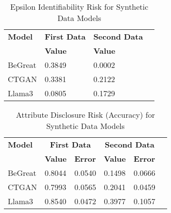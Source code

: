 \begin{table}[H]
    \centering
    \caption{Epsilon Identifiability Risk for Synthetic Data Models}
    \label{tab:epsilon_identifiability_risk_combined}
    \begin{tabularx}{\textwidth}{l*{5}{X}}
        \toprule
        \textbf{Model} & \multicolumn{2}{c}{\textbf{First Data}} & \multicolumn{2}{c}{\textbf{Second Data}} \\
        \cmidrule(lr){2-3} \cmidrule(lr){4-5}
        & \textbf{Value} & & \textbf{Value} \\
        \midrule
        BeGreat & 0.3849 & & 0.0002 \\
        CTGAN & 0.3381 & & 0.2122 \\
        Llama3 & 0.0805 & & 0.1729 \\
        \bottomrule
    \end{tabularx}
\end{table}

\begin{table}[H]
    \centering
    \caption{Attribute Disclosure Risk (Accuracy) for Synthetic Data Models}
    \label{tab:attr_disclosure_risk_combined}
    \begin{tabularx}{\textwidth}{l*{5}{X}}
        \toprule
        \textbf{Model} & \multicolumn{2}{c}{\textbf{First Data}} & \multicolumn{2}{c}{\textbf{Second Data}} \\
        \cmidrule(lr){2-3} \cmidrule(lr){4-5}
        & \textbf{Value} & \textbf{Error} & \textbf{Value} & \textbf{Error} \\
        \midrule
        BeGreat & 0.8044 & 0.0540 & 0.1498 & 0.0666 \\
        CTGAN & 0.7993 & 0.0565 & 0.2041 & 0.0459 \\
        Llama3 & 0.8540 & 0.0472 & 0.3977 & 0.1057 \\
        \bottomrule
    \end{tabularx}
\end{table}




